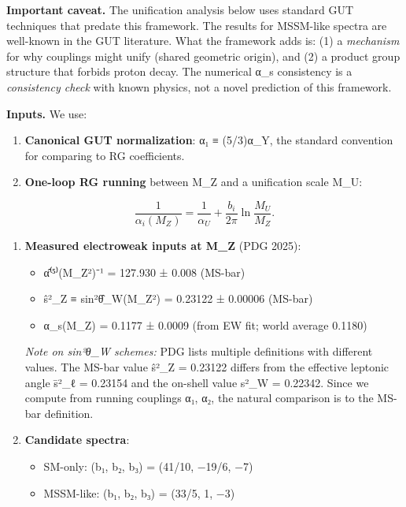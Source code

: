 \textbf{Important caveat.} The unification analysis below uses standard GUT techniques that predate this framework. The results for MSSM-like spectra are well-known in the GUT literature. What the framework adds is: (1) a \emph{mechanism} for why couplings might unify (shared geometric origin), and (2) a product group structure that forbids proton decay. The numerical α\_s consistency is a \emph{consistency check} with known physics, not a novel prediction of this framework.

\textbf{Inputs.} We use:

\begin{enumerate}
\def\labelenumi{\arabic{enumi}.}
\item
  \textbf{Canonical GUT normalization}: α₁ ≡ (5/3)α\_Y, the standard convention for comparing to RG coefficients.
\item
  \textbf{One-loop RG running} between M\_Z and a unification scale M\_U:
\end{enumerate}

\[
\frac{1}{\alpha_i(M_Z)} = \frac{1}{\alpha_U} + \frac{b_i}{2\pi}
\ln\frac{M_U}{M_Z}.
\]

\begin{enumerate}
\def\labelenumi{\arabic{enumi}.}
\setcounter{enumi}{2}
\item
  \textbf{Measured electroweak inputs at M\_Z} (PDG 2025):

  \begin{itemize}
  \tightlist
  \item
    \^{α}⁽⁵⁾(M\_Z²)⁻¹ = 127.930 ± 0.008 (MS-bar)
  \item
    \^{s}²\_Z ≡ sin²\^{θ}\_W(M\_Z²) = 0.23122 ± 0.00006 (MS-bar)
  \item
    α\_s(M\_Z) = 0.1177 ± 0.0009 (from EW fit; world average 0.1180)
  \end{itemize}

  \emph{Note on sin²θ\_W schemes:} PDG lists multiple definitions with different values. The MS-bar value \^{s}²\_Z = 0.23122 differs from the effective leptonic angle \={s}²\_ℓ = 0.23154 and the on-shell value s²\_W = 0.22342. Since we compute from running couplings α₁, α₂, the natural comparison is to the MS-bar definition.
\item
  \textbf{Candidate spectra}:

  \begin{itemize}
  \tightlist
  \item
    SM-only: (b₁, b₂, b₃) = (41/10, −19/6, −7)
  \item
    MSSM-like: (b₁, b₂, b₃) = (33/5, 1, −3)
  \end{itemize}
\end{enumerate}


